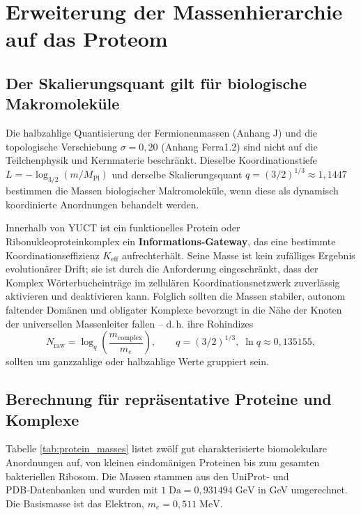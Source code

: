 \documentclass[12pt,a4paper]{article}
\begin{document}
	\section{Erweiterung der Massenhierarchie auf das Proteom}
	\label{sec:protein_hierarchy}
	
	\subsection{Der Skalierungsquant gilt für biologische Makromoleküle}
	
	Die halbzahlige Quantisierung der Fermionenmassen (Anhang J) und die topologische Verschiebung \(\sigma = 0,20\) (Anhang Ferra1.2) sind nicht auf die Teilchenphysik und Kernmaterie beschränkt. Dieselbe Koordinationstiefe \(L = -\log_{3/2}(m/M_{\mathrm{Pl}})\) und derselbe Skalierungsquant \(q = (3/2)^{1/3} \approx 1,1447\) bestimmen die Massen biologischer Makromoleküle, wenn diese als dynamisch koordinierte Anordnungen behandelt werden.
	
	Innerhalb von YUCT ist ein funktionelles Protein oder Ribonukleoproteinkomplex ein \textbf{Informations‑Gateway}, das eine bestimmte Koordinationseffizienz \(K_{\mathrm{eff}}\) aufrechterhält. Seine Masse ist kein zufälliges Ergebnis evolutionärer Drift; sie ist durch die Anforderung eingeschränkt, dass der Komplex Wörterbucheinträge im zellulären Koordinationsnetzwerk zuverlässig aktivieren und deaktivieren kann. Folglich sollten die Massen stabiler, autonom faltender Domänen und obligater Komplexe bevorzugt in die Nähe der Knoten der universellen Massenleiter fallen -- d.\,h. ihre Rohindizes
	\[
	N_{\mathrm{raw}} = \log_q\!\left(\frac{m_{\mathrm{complex}}}{m_e}\right),
	\qquad q = (3/2)^{1/3},\; \ln q \approx 0,135155,
	\]
	sollten um ganzzahlige oder halbzahlige Werte gruppiert sein.
	
	\subsection{Berechnung für repräsentative Proteine und Komplexe}
	
	Tabelle \ref{tab:protein_masses} listet zwölf gut charakterisierte biomolekulare Anordnungen auf, von kleinen eindomänigen Proteinen bis zum gesamten bakteriellen Ribosom. Die Massen stammen aus den UniProt‑ und PDB‑Datenbanken und wurden mit \(1\;\text{Da} = 0,931494\;\text{GeV}\) in GeV umgerechnet. Die Basismasse ist das Elektron, \(m_e = 0,511\;\text{MeV}\).
	
\end{document}
